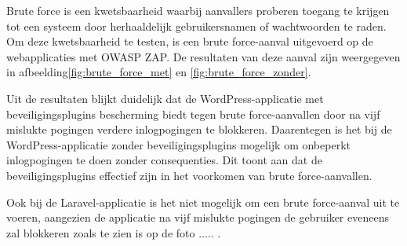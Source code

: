 Brute force is een kwetsbaarheid waarbij aanvallers proberen toegang te krijgen tot een systeem door herhaaldelijk gebruikersnamen 
of wachtwoorden te raden. Om deze kwetsbaarheid te testen, is een brute force-aanval uitgevoerd op de webapplicaties met OWASP ZAP. De 
resultaten van deze aanval zijn weergegeven in afbeelding\ref{fig:brute_force_met} en \ref{fig:brute_force_zonder}. 

Uit de resultaten blijkt duidelijk dat de WordPress-applicatie met beveiligingsplugins bescherming biedt tegen brute 
force-aanvallen door na vijf mislukte pogingen verdere inlogpogingen te blokkeren. Daarentegen is het bij de 
WordPress-applicatie zonder beveiligingsplugins mogelijk om onbeperkt inlogpogingen te doen zonder consequenties. Dit toont 
aan dat de beveiligingsplugins effectief zijn in het voorkomen van brute force-aanvallen.

Ook bij de Laravel-applicatie is het niet mogelijk om een brute force-aanval uit te voeren, aangezien de applicatie na vijf 
mislukte pogingen de gebruiker eveneens zal blokkeren zoals te zien is op de foto ..... .
